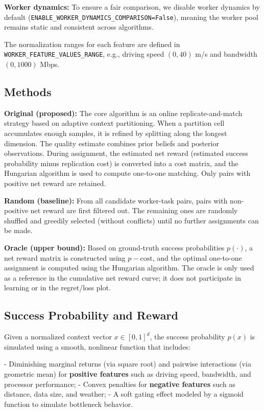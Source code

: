 \textbf{Worker dynamics:} To ensure a fair comparison, we disable worker dynamics by default (\texttt{ENABLE\_WORKER\_DYNAMICS\_COMPARISON=False}), meaning the worker pool remains static and consistent across algorithms.

The normalization ranges for each feature are defined in \texttt{WORKER\_FEATURE\_VALUES\_RANGE}, e.g., driving speed $(0, 40)$ m/s and bandwidth $(0, 1000)$ Mbps.

\subsection{Methods}

\textbf{Original (proposed):} The core algorithm is an online replicate-and-match strategy based on adaptive context partitioning. When a partition cell accumulates enough samples, it is refined by splitting along the longest dimension. The quality estimate combines prior beliefs and posterior observations. During assignment, the estimated net reward (estimated success probability minus replication cost) is converted into a cost matrix, and the Hungarian algorithm is used to compute one-to-one matching. Only pairs with positive net reward are retained.

\textbf{Random (baseline):} From all candidate worker-task pairs, pairs with non-positive net reward are first filtered out. The remaining ones are randomly shuffled and greedily selected (without conflicts) until no further assignments can be made.

\textbf{Oracle (upper bound):} Based on ground-truth success probabilities $p(\cdot)$, a net reward matrix is constructed using $p - \text{cost}$, and the optimal one-to-one assignment is computed using the Hungarian algorithm. The oracle is only used as a reference in the cumulative net reward curve; it does not participate in learning or in the regret/loss plot.

\subsection{Success Probability and Reward}
Given a normalized context vector $x \in [0,1]^d$, the success probability $p(x)$ is simulated using a smooth, nonlinear function that includes:

- Diminishing marginal returns (via square root) and pairwise interactions (via geometric mean) for \textbf{positive features} such as driving speed, bandwidth, and processor performance;
- Convex penalties for \textbf{negative features} such as distance, data size, and weather;
- A soft gating effect modeled by a sigmoid function to simulate bottleneck behavior.


